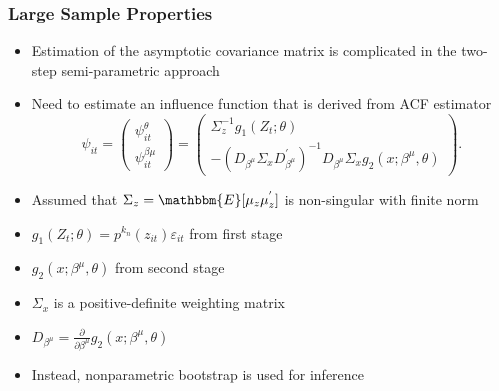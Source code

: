 \documentclass[xcolor={dvipsnames}, notheorems]{beamer}
\theoremstyle{plain}
\begin{document}

\begin{frame}
\frametitle{Large Sample Properties}
\begin{itemize}
	\item Estimation of the asymptotic covariance matrix is complicated in the two-step semi-parametric approach
	\item Need to estimate an influence function that is derived from ACF estimator
	\begin{equation*}
		\psi_{it}=
		\begin{pmatrix}
		\psi^{\theta}_{it}\\
		\psi^{\beta{\mu}}_{it}
		\end{pmatrix}
		=
		\begin{pmatrix}
		\Sigma_{z}^{-1}g_{1}(Z_{t};\theta)\\
		-(D_{\beta^{\mu}}\Sigma_{x}D_{\beta^{\mu}}^{'})^{-1}D_{\beta^{\mu}}\Sigma_{x}g_{2}(x; \beta^{\mu}, \theta)
		\end{pmatrix}.
	\end{equation*}
	\item Assumed that $\Sigma_{z}=\mathbbm{E}[\mu_{z}\mu_{z}^{'}]$ is non-singular with finite norm
	\item $g_{1}(Z_{t};\theta)=p^{k_{n}}(z_{it})\varepsilon_{it}$ from first stage
	\item $g_{2}(x; \beta^{\mu}, \theta)$ from second stage
	\item $\Sigma_{x}$ is a positive-definite weighting matrix
	\item $D_{\beta^{\mu}}=\frac{\partial}{\partial \beta^{\mu}}g_{2}(x; \beta^{\mu}, \theta)$
	\item Instead, nonparametric bootstrap is used for inference
\end{itemize}
\end{frame}

\end{document}
